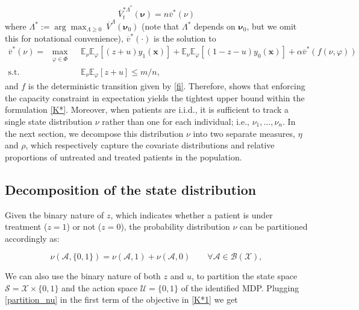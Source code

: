 \documentclass[12pt,a4paper]{article}
\newcommand{\bnu}{\pmb{\nu}}
\newcommand{\bx}{\mathbf{x}}
\newcommand{\mA}{\mathcal{A}}
\newcommand{\mX}{\mathcal{X}}
\newcommand{\mS}{\mathcal{S}}
\newcommand{\mU}{\mathcal{U}}
\newcommand{\mBX}{ \mathcal{B}(\mathcal{X})}
\newcommand{\oV}{\overline{V}}
\newcommand{\ov}{\overline{v}}
\begin{document}
	\begin{equation} \label{collapse}
		\oV^{*\Lambda^*}_t(\bnu)=n\ov^*(\nu)
	\end{equation}
	where $\Lambda^*:=\arg\max_{\Lambda\geq 0} \ \oV^\Lambda(\bnu_0)$ (note that $\Lambda^*$ depends on $\bnu_0$, but we omit this for notational convenience), $\ov^*(\cdot)$ is the solution to
	\begin{align}\label{K*1}\tag{K$^*_1$}
		\ov^*(\nu)= \ \max_{\substack{\varphi \in \Phi}}& \ \mathbb{E}_{\nu}\mathbb{E}_{\varphi} [(z+u) y_1(\bx)]+\mathbb{E}_{\nu}\mathbb{E}_{\varphi} [(1-z-u) y_0(\bx)] + \alpha \ov^{*}(f(\nu,\varphi))\\
		\mbox{s.t.} & \  \mathbb{E}_{\nu}\mathbb{E}_{\varphi} [z+u] \leq m/n, \nonumber
	\end{align}
and $f$ is the deterministic transition given by \eqref{fi}. Therefore, \cite{measurizedWMDP} shows that enforcing the capacity constraint in expectation yields the tightest upper bound within the formulation \eqref{K*}. Moreover, when patients are i.i.d., it is sufficient to track a single state distribution $\nu$ rather than one for each individual; i.e., $\nu_1,...,\nu_n$. In the next section, we decompose this distribution $\nu$ into two separate measures, $\eta$ and $\rho$, which respectively capture the covariate distributions and relative proportions of untreated and treated patients in the population.

\subsection{Decomposition of the state distribution}
 Given the binary nature of $z$, which indicates whether a patient is under treatment ($z = 1$) or not ($z = 0$), the probability distribution $\nu$ can be partitioned accordingly as:

	
	\begin{equation}\label{partition_nu}
		\nu(\mA,\{0,1\})=\nu(\mA,1)+\nu(\mA,0) \qquad \forall \mA \in \mBX, 
	\end{equation}
	
	\noindent We can also use the binary nature of both $z$ and $u$, to partition the state space $\mS=\mX \times \{0,1\}$ and the action space $\mU=\{0,1\}$ of the identified MDP. Plugging \eqref{partition_nu} in the first term of the objective in \eqref{K*1} we get
	
\end{document}
